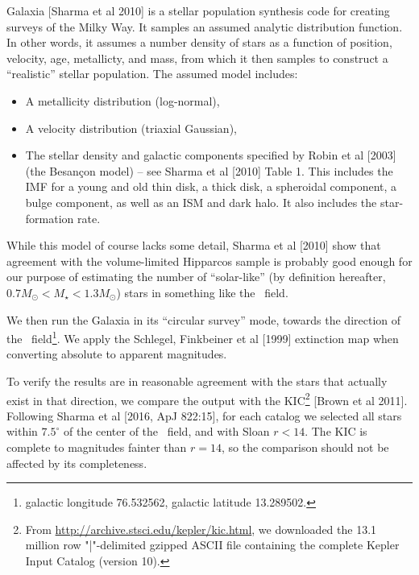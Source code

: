 \documentclass{emulateapj}
\begin{document}
Galaxia [Sharma et al 2010] is a stellar population synthesis code for creating 
surveys of the Milky Way. It samples an assumed analytic distribution function. 
In other words, it assumes a number density of stars as a function of position, 
velocity, age, metallicty, and mass, from which it then samples to construct a 
``realistic'' stellar population.
The assumed model includes:
\begin{itemize}
	\item A metallicity distribution (log-normal),
	\item A velocity distribution (triaxial Gaussian),
	\item The stellar density and galactic components specified by Robin et al 
	[2003] (the Besan\c{c}on model) -- see Sharma et al [2010] Table 1. This 
	includes the IMF for a young and old thin disk, a thick disk, a spheroidal 
	component, a bulge component, as well as an ISM and dark halo. It also 
	includes the star-formation rate.
\end{itemize}

While this model of course lacks some detail, Sharma et al [2010] show that 
agreement with the volume-limited Hipparcos sample is probably good enough for 
our purpose of estimating the number of ``solar-like'' (by definition 
hereafter, $0.7 M_\odot < M_\star < 1.3 M_\odot$) stars in something like the 
\kepler\ field.

We then run the Galaxia in its ``circular survey'' mode, towards the direction 
of the \kepler\ field\footnote{galactic longitude 76.532562, galactic latitude 
13.289502.}. We apply the Schlegel, Finkbeiner et al [1999] extinction map when 
converting absolute to apparent magnitudes.

To verify the results are in reasonable agreement with the stars that actually 
exist in that direction, we compare the output with the KIC\footnote{From 
\url{http://archive.stsci.edu/kepler/kic.html}, we 
downloaded the 13.1 million row "|"-delimited gzipped ASCII file containing the 
complete Kepler Input Catalog (version 10).} [Brown et al 2011].
Following Sharma et al [2016, ApJ 822:15], for each catalog we selected all 
stars within $7.5^\circ$ of the center of the \kepler\ field, and with Sloan $r 
< 14$.
The KIC is complete to magnitudes fainter than $r=14$, so the comparison should 
not be affected by its completeness.
\end{document}
